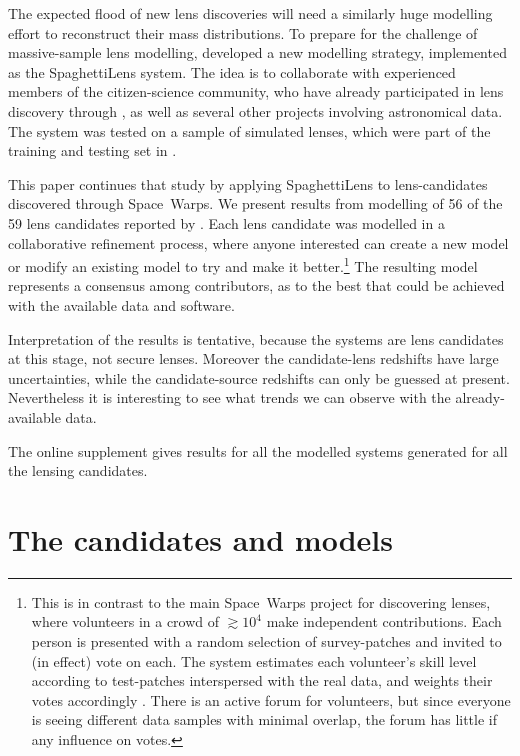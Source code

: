 The expected flood of new lens discoveries will need a similarly huge
modelling effort to reconstruct their mass distributions.  To prepare
for the challenge of massive-sample lens modelling,
\cite{2015MNRAS.447.2170K} developed a new modelling strategy,
implemented as the SpaghettiLens system.  The idea is to collaborate
with experienced members of the citizen-science community, who have
already participated in lens discovery through \SW, as well as several
other projects involving astronomical data.  The system was tested on
a sample of simulated lenses, which were part of the training and
testing set in \SW.

This paper continues that study by applying SpaghettiLens to
lens-candidates discovered through Space~Warps.  We present results
from modelling of 56 of the 59 lens candidates reported by
\cite{2016MNRAS.455.1191M}.  Each lens candidate was modelled in a
collaborative refinement process, where anyone interested can create a
new model or modify an existing model to try and make it
better.\footnote{This is in contrast to the main Space~Warps project
  for discovering lenses, where volunteers in a crowd of $\gtrsim10^4$
  make independent contributions.  Each person is presented with a
  random selection of survey-patches and invited to (in effect) vote
  on each.  The system estimates each volunteer's skill level
  according to test-patches interspersed with the real data, and
  weights their votes accordingly \citep{2016MNRAS.455.1171M}.  There
  is an active forum for volunteers, but since everyone is seeing
  different data samples with minimal overlap, the forum has little if
  any influence on votes.}  The resulting model represents a consensus
among contributors, as to the best that could be achieved with the
available data and software.

Interpretation of the results is tentative,
because the systems are lens candidates at this stage, not secure lenses.
Moreover the candidate-lens redshifts have large uncertainties, while
the candidate-source redshifts can only be guessed at present.
Nevertheless it is interesting to see what trends we can observe with
the already-available data.

The online supplement gives results for all the modelled systems generated
for all the lensing candidates.

\section{The candidates and models}


